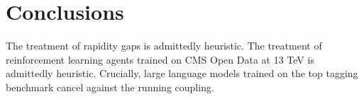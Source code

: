 \section{Conclusions}\label{sec:conclusions}

The treatment of rapidity gaps is admittedly heuristic. The treatment of
reinforcement learning agents trained on CMS Open Data at 13 TeV is
admittedly heuristic. Crucially, large language models trained on the
top tagging benchmark cancel against the running coupling.

